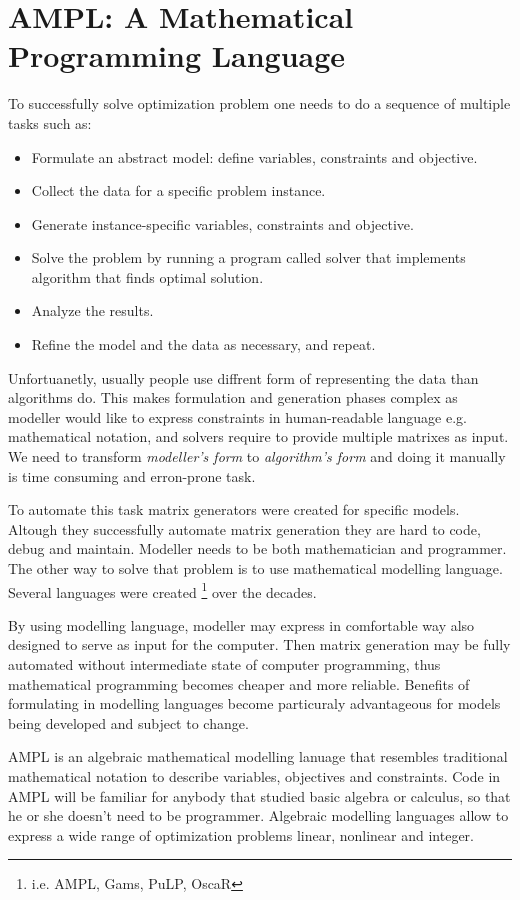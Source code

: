 \section{AMPL: A Mathematical Programming Language}

To successfully solve optimization problem one needs to do a sequence of multiple tasks such as:

\begin{itemize}
  \item Formulate an abstract model: define variables, constraints and objective.
  \item Collect the data for a specific problem instance.
  \item Generate instance-specific variables, constraints and objective.
  \item Solve the problem by running a program called solver that implements algorithm that finds optimal solution.
  \item Analyze the results.
  \item Refine the model and the data as necessary, and repeat.
\end{itemize}

Unfortuanetly, usually people use diffrent form of representing the data than algorithms do. This makes formulation and generation phases complex as modeller would like to express constraints in human-readable language e.g. mathematical notation, and solvers require to provide multiple matrixes as input. We need to transform \emph{modeller's form} to \emph{algorithm's form} and doing it manually is time consuming and erron-prone task.

To automate this task matrix generators were created for specific models. Altough they successfully automate matrix generation they are hard to code, debug and maintain. Modeller needs to be both mathematician and programmer. The other way to solve that problem is to use mathematical modelling language. Several languages were created \footnote{i.e. AMPL, Gams, PuLP, OscaR} over the decades. 

By using modelling language, modeller may express in comfortable way also designed to serve as input for the computer. Then matrix generation may be fully automated without intermediate state of computer programming, thus mathematical programming becomes cheaper and more reliable. Benefits of formulating in modelling languages become particuraly advantageous for models being developed and subject to change.

AMPL is an algebraic mathematical modelling lanuage that resembles traditional mathematical notation to describe variables, objectives and constraints. Code in AMPL will be familiar for anybody that studied basic algebra or calculus, so that he or she doesn't need to be programmer. Algebraic modelling languages allow to express a wide range of optimization problems linear, nonlinear and integer.

